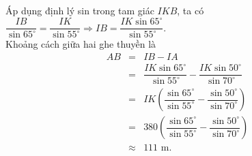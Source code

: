 \begin{ex}
{	Áp dụng định lý sin trong tam giác $IKB$, ta có $\dfrac{IB}{\sin 65^\circ}=\dfrac{IK}{\sin 55^\circ}\Rightarrow IB=\dfrac{IK\sin 65^\circ}{\sin 55^\circ}$.\\
	Khoảng cách giữa hai ghe thuyền là
	\begin{eqnarray*}
		AB&=&IB-IA\\
		&=&\dfrac{IK\sin{65^\circ}}{\sin{55^\circ}}-\dfrac{IK\sin{50^\circ}}{\sin{70^\circ}}\\
		&=&IK\left( \dfrac{\sin 65^\circ}{\sin 55^\circ}-\dfrac{\sin 50^\circ}{\sin 70^\circ}\right)\\
		&=&380\left( \dfrac{\sin 65^\circ}{\sin 55^\circ}-\dfrac{\sin 50^\circ}{\sin 70^\circ}\right)\\
		&\approx& 111 \text{ m}.
	\end{eqnarray*}
	}
\end{ex}
